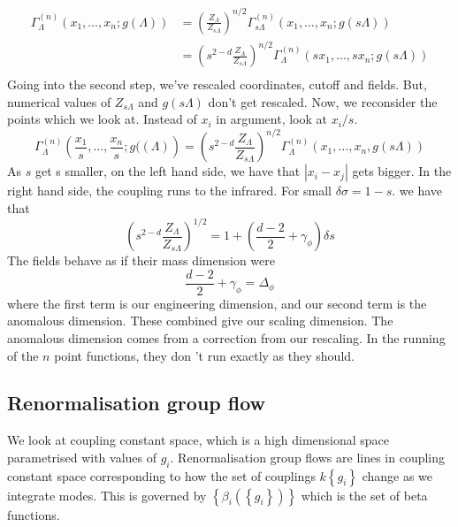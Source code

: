 \documentclass[11pt, oneside]{article}   	%
\theoremstyle{slanted}
\begin{document}
\begin{align*}
\Gamma _{ \Lambda } ^{ \left(  n  \right)  } 
\left(  x _ 1, \dots , x _ n ; g ( \Lambda  ) \right)  &=  
\left( \frac{Z _ \Lambda }{ Z _{ s \Lambda } }  \right) ^{ n / 2 } 
\Gamma ^{ \left( n  \right)  } _{ s \Lambda } 
\left( x _ 1, \dots , x _ n ; g (s \Lambda  ) \right)  \\
						       &=  \left( s ^{  2-  d } 
						       \frac{Z _ \Lambda }{ 
					       Z _{ s \Lambda } } \right)
					       ^{ n / 2 } \Gamma 
					       _{ \Lambda } ^{ \left(  n  \right)  } 
					       \left(  s x_ 1 ,\dots , s x _ n ; 
					       g \left(  s \Lambda  \right)  \right) \\
\end{align*} 
Going into the second step, we've 
rescaled coordinates, cutoff and fields. 
But, numerical values of $ Z _{ s \Lambda }  $ and 
$ g \left(  s \Lambda  \right)  $ don't get rescaled. 
Now, we reconsider the points which we 
look at. Instead of $ x _ i $ in argument, 
look at $ x _ i  / s $. 
\[
\Gamma _{ \Lambda } ^{ \left( n  \right)  } 
\left( \frac{x_1}{s} , \dots, \frac{ x_ n }{ s } ; 
g (\left( \Lambda  \right)  \right) = 
\left( s ^{ 2 - d } \frac{ Z _{ \Lambda }  }{ Z _{ s \Lambda } }    \right)^{ n / 2 } 
\Gamma _{ \Lambda } ^{ \left( n  \right)  } \left( 
x_ 1 , \dots , x _ n  , g \left( s \Lambda  \right)  \right)  
\] As $ s $ get s smaller, on the left hand 
side, we have that $ | x _ i - x _ j | $ gets bigger. 
In the right hand side, the coupling runs 
to the infrared. 
For small  $ \delta \sigma  = 1 - s $. 
we have that 
\[
\left( s ^{ 2 - d } \frac{ Z_ \Lambda }{ 
Z _{ s \Lambda } }   \right) ^{ 1  / 2 } = 1 
+ \left( \frac{ d - 2 }{ 2 } + \gamma _ \phi    \right) \delta s 
\] The fields behave as if their mass dimension were
\[
\frac{ d - 2 }{ 2 } + \gamma _{ \phi}  = \Delta _ \phi 
\] where the first term is our  engineering dimension, 
and our second term is the anomalous dimension. 
These combined give our scaling dimension. 
The anomalous dimension comes 
from a correction from our rescaling. 
In the running of the $ n $ point functions, 
they don 't run exactly as they should. 

\subsection{Renormalisation group flow}

We look at coupling constant space, 
which is a high dimensional space 
parametrised with values of $ g _ i  $. 
Renormalisation group flows 
are lines in coupling constant space 
corresponding to how 
the set of couplings $ k\left\{  g _ i  \right\}  $ 
change as we integrate modes. 
This is governed by $ \left\{  
\beta _ i \left( \left\{  g _  i  \right\}   \right) \right\} $
which is the set of beta functions. 
\end{document}

